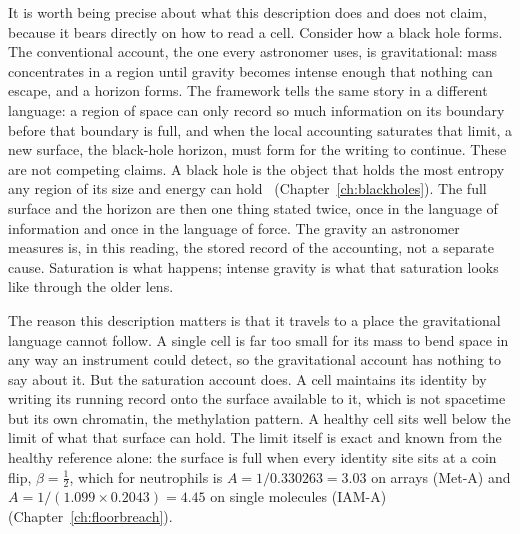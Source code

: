 It is worth being precise about what this description does and does not claim, because it bears directly on how to read a cell. Consider
how a black hole forms. The conventional account, the one every astronomer uses, is gravitational: mass concentrates in a region until
gravity becomes intense enough that nothing can escape, and a horizon forms. The framework tells the same story in a different language: a
region of space can only record so much information on its boundary before that boundary is full, and when the local accounting
saturates that limit, a new surface, the black-hole horizon, must form for the writing to continue. These are not competing claims. A black
hole is the object that holds the most entropy any region of its size and energy can hold~\cite{Bekenstein1981} (Chapter~\ref{ch:blackholes}).
\derived{} The full surface and the horizon are then one thing stated twice, once in the language of information and once in the language
of force. \interp{} The gravity an astronomer measures is, in this reading, the stored record of the accounting, not a separate cause. Saturation is
what happens; intense gravity is what that saturation looks like through the older lens. \interp

The reason this description matters is that it travels to a place the gravitational language cannot follow. A single cell is far too small
for its mass to bend space in any way an instrument could detect, so the gravitational account has nothing to say about it. But the
saturation account does. A cell maintains its identity by writing its running record onto the surface available to it, which is not
spacetime but its own chromatin, the methylation pattern. A healthy cell sits well below the limit of what that surface can hold. The limit
itself is exact and known from the healthy reference alone: the surface is full when every identity site sits at a coin flip,
$\beta=\tfrac12$, which for neutrophils is $A=1/0.330263=3.03$ on arrays (Met-A) and $A=1/(1.099\times0.2043)=4.45$ on single molecules
(IAM-A) (Chapter~\ref{ch:floorbreach}). \calc

